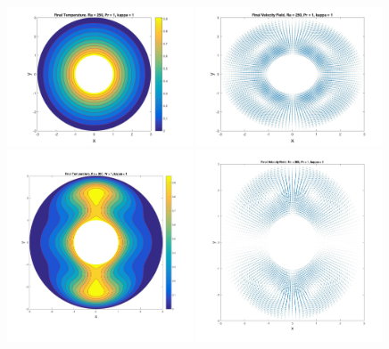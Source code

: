 \documentclass{article}
\begin{document}
	\begin{figure}[h!]
		\centering
		\includegraphics[width = 0.49\textwidth]{fig_q4ra250b3}
		\includegraphics[width = 0.49\textwidth]{fig_q4ura250b3}
		\includegraphics[width = 0.49\textwidth]{fig_q4ra300b3}
		\includegraphics[width = 0.49\textwidth]{fig_q4ura300b3}

\end{figure}
\end{document}
